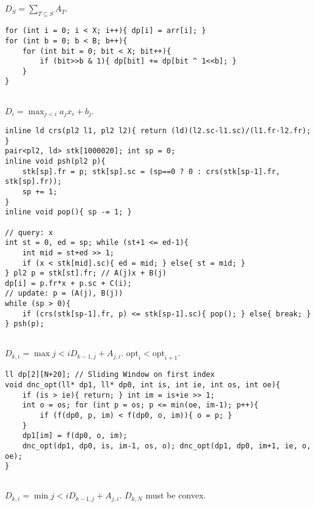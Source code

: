 \documentclass[landscape, 8pt, a4paper, oneside, twocolumn]{extarticle}
\begin{document}
\subsection{}
$D_S = \sum_{T \subseteq S} A_T$.

\begin{verbatim}
for (int i = 0; i < X; i++){ dp[i] = arr[i]; }
for (int b = 0; b < B; b++){
    for (int bit = 0; bit < X; bit++){
        if (bit>>b & 1){ dp[bit] += dp[bit ^ 1<<b]; }
    }
}
\end{verbatim}
\subsection{}
$D_i = \max_{j < i} a_j x_i + b_j$.

\begin{verbatim}
inline ld crs(pl2 l1, pl2 l2){ return (ld)(l2.sc-l1.sc)/(l1.fr-l2.fr); }
pair<pl2, ld> stk[1000020]; int sp = 0;
inline void psh(pl2 p){
    stk[sp].fr = p; stk[sp].sc = (sp==0 ? 0 : crs(stk[sp-1].fr, stk[sp].fr));
    sp += 1;
}
inline void pop(){ sp -= 1; }

// query: x
int st = 0, ed = sp; while (st+1 <= ed-1){
    int mid = st+ed >> 1;
    if (x < stk[mid].sc){ ed = mid; } else{ st = mid; }
} pl2 p = stk[st].fr; // A(j)x + B(j)
dp[i] = p.fr*x + p.sc + C(i);
// update: p = (A(j), B(j))
while (sp > 0){
    if (crs(stk[sp-1].fr, p) <= stk[sp-1].sc){ pop(); } else{ break; }
} psh(p);
\end{verbatim}
\subsection{}
$D_{k,i} = \max{j<i} D_{k-1,j} + A_{j,i}$. $\mathrm{opt}_i < \mathrm{opt}_{i+1}$.

\begin{verbatim}
ll dp[2][N+20]; // Sliding Window on first index
void dnc_opt(ll* dp1, ll* dp0, int is, int ie, int os, int oe){
    if (is > ie){ return; } int im = is+ie >> 1;
    int o = os; for (int p = os; p <= min(oe, im-1); p++){
        if (f(dp0, p, im) < f(dp0, o, im)){ o = p; }
    }
    dp1[im] = f(dp0, o, im);
    dnc_opt(dp1, dp0, is, im-1, os, o); dnc_opt(dp1, dp0, im+1, ie, o, oe);
}
\end{verbatim}
\subsection{}
$D_{k,i} = \min{j<i} D_{k-1,j} + A_{j,i}$. $D_{k,N}$ must be convex.
\end{document}
